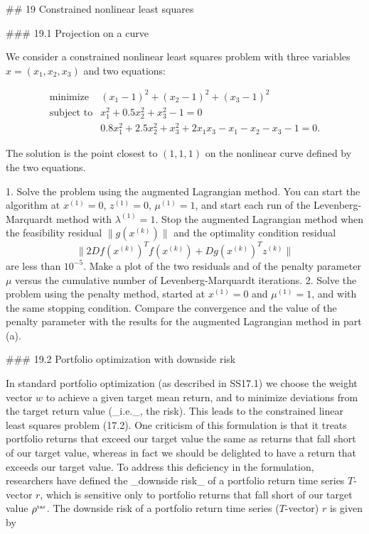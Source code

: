 

## 19 Constrained nonlinear least squares

### 19.1 Projection on a curve

We consider a constrained nonlinear least squares problem with three variables \(x=(x_{1},x_{2},x_{3})\) and two equations:

\[\begin{array}{ll}\mbox{minimize}&(x_{1}-1)^{2}+(x_{2}-1)^{2}+(x_{3}-1)^{2}\\ \mbox{subject to}&x_{1}^{2}+0.5x_{2}^{2}+x_{3}^{2}-1=0\\ &0.8x_{1}^{2}+2.5x_{2}^{2}+x_{3}^{2}+2x_{1}x_{3}-x_{1}-x_{2}-x_{3}-1=0.\end{array}\]

The solution is the point closest to \((1,1,1)\) on the nonlinear curve defined by the two equations.

1. Solve the problem using the augmented Lagrangian method. You can start the algorithm at \(x^{(1)}=0\), \(z^{(1)}=0\), \(\mu^{(1)}=1\), and start each run of the Levenberg-Marquardt method with \(\lambda^{(1)}=1\). Stop the augmented Lagrangian method when the feasibility residual \(\|g(x^{(k)})\|\) and the optimality condition residual \[\|2Df(x^{(k)})^{T}f(x^{(k)})+Dg(x^{(k)})^{T}z^{(k)}\|\] are less than \(10^{-5}\). Make a plot of the two residuals and of the penalty parameter \(\mu\) versus the cumulative number of Levenberg-Marquardt iterations.
2. Solve the problem using the penalty method, started at \(x^{(1)}=0\) and \(\mu^{(1)}=1\), and with the same stopping condition. Compare the convergence and the value of the penalty parameter with the results for the augmented Lagrangian method in part (a).

### 19.2 Portfolio optimization with downside risk

In standard portfolio optimization (as described in SS17.1) we choose the weight vector \(w\) to achieve a given target mean return, and to minimize deviations from the target return value (_i.e._, the risk). This leads to the constrained linear least squares problem (17.2). One criticism of this formulation is that it treats portfolio returns that exceed our target value the same as returns that fall short of our target value, whereas in fact we should be delighted to have a return that exceeds our target value. To address this deficiency in the formulation, researchers have defined the _downside risk_ of a portfolio return time series \(T\)-vector \(r\), which is sensitive only to portfolio returns that fall short of our target value \(\rho^{\mbox{\tiny tar}}\). The downside risk of a portfolio return time series (\(T\)-vector) \(r\) is given by

